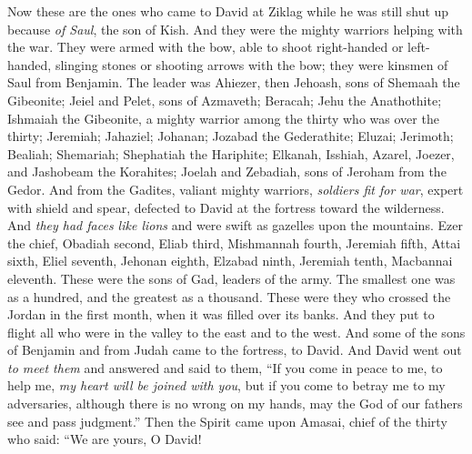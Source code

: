 \begin{biblechapter} %
 Now these are the ones who came to David at Ziklag while he was still shut up because \textit{of Saul}, the son of Kish. And they were the mighty warriors helping with the war.
\verse They were armed with the bow, able to shoot right-handed or left-handed, slinging stones or shooting arrows with the bow; they were kinsmen of Saul from Benjamin.
\verse The leader was Ahiezer, then Jehoash, sons of Shemaah the Gibeonite; Jeiel and Pelet, sons of Azmaveth; Beracah; Jehu the Anathothite;
\verse Ishmaiah the Gibeonite, a mighty warrior among the thirty who was over the thirty; Jeremiah; Jahaziel; Johanan; Jozabad the Gederathite;
\verse {} Eluzai; Jerimoth; Bealiah; Shemariah; Shephatiah the Hariphite;
\verse Elkanah, Isshiah, Azarel, Joezer, and Jashobeam the Korahites;
\verse Joelah and Zebadiah, sons of Jeroham from the Gedor.
\verse And from the Gadites, valiant mighty warriors, \textit{soldiers fit for war}, expert with shield and spear, defected to David at the fortress toward the wilderness. And \textit{they had faces like lions} and were swift as gazelles upon the mountains.
\verse Ezer the chief, Obadiah second, Eliab third,
\verse Mishmannah fourth, Jeremiah fifth,
\verse Attai sixth, Eliel seventh,
\verse Jehonan eighth, Elzabad ninth,
\verse Jeremiah tenth, Macbannai eleventh.
\verse These were the sons of Gad, leaders of the army. The smallest one was as a hundred, and the greatest as a thousand.
\verse These were they who crossed the Jordan in the first month, when it was filled over its banks. And they put to flight all who were in the valley to the east and to the west.
\verse And some of the sons of Benjamin and from Judah came to the fortress, to David.
\verse And David went out \textit{to meet them} and answered and said to them, “If you come in peace to me, to help me, \textit{my heart will be joined with you}, but if you come to betray me to my adversaries, although there is no wrong on my hands, may the God of our fathers see and pass judgment.”
\verse Then the Spirit came upon Amasai, chief of the thirty who said: “We are yours, O David! 

\end{biblechapter}
